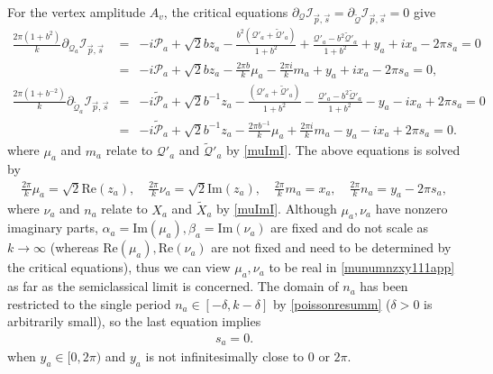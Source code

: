 \documentclass[aps,prd,notitlepage,nofootinbib,superscriptaddress,groupedaddress,twocolumn]{revtex4-1}
\def\be{\begin{eqnarray}}
\def\ee{\end{eqnarray}}
\newcommand{\ci}{\mathcal I}
\newcommand{\scrp}{\mathscr{P}}
\newcommand{\scrq}{\mathscr{Q}}
\renewcommand{\a}{\alpha}
\renewcommand{\b}{\beta}
\newcommand{\lt}{\left}
\newcommand{\rt}{\right}
\begin{document}
For the vertex amplitude $A_v$, the critical equations $\partial_\scrq\ci_{\vec{p},\vec{s}}=\partial_{\widetilde{\scrq}}\ci_{\vec{p},\vec{s}}=0$ give
\be
\frac{2 \pi\left(1+b^{2}\right)}{k}\partial_{\mathscr{Q}_a} \ci_{\vec{p},\vec{s}}&=&-i{\scrp}_a+\sqrt{2}bz_a-\frac{b^2\lt(\scrq'_a+\widetilde{\scrq}'_a\rt)}{1+b^2}+\frac{\scrq'_a-b^2\widetilde{\scrq}'_a}{1+b^2}+y_a+ix_a-2\pi s_a=0\\
&=&-i{\scrp}_a+\sqrt{2}bz_a-\frac{2\pi b}{k}\mu_a-\frac{2\pi i}{k}m_a+y_a+ix_a-2\pi s_a=0, \\
\frac{2 \pi\left(1+b^{-2}\right)}{k}\partial_{\widetilde{\mathscr{Q}}_a} \ci_{\vec{p},\vec{s}}
&=&-i\widetilde{\scrp}_a+\sqrt{2}b^{-1}z_a-\frac{\lt(\scrq'_a+\widetilde{\scrq}'_a\rt)}{1+b^2}-\frac{\scrq'_a-b^2\widetilde{\scrq}'_a}{1+b^2}-y_a-ix_a+2\pi s_a=0\\
&=&-i\widetilde{\scrp}_a+\sqrt{2}b^{-1}z_a-\frac{2\pi b^{-1}}{k}\mu_a+\frac{2\pi i}{k}m_a-y_a-ix_a+2\pi s_a=0.
\ee
where $\mu_a$ and $m_a$ relate to $\scrq'_a$ and $\widetilde{\scrq}'_a$ by \eqref{muImI}. The above equations is solved by 
\be
\frac{2\pi}{k}\mu_a=\sqrt{2}\mathrm{Re}(z_a),\quad \frac{2\pi}{k}\nu_a=\sqrt{2}\mathrm{Im}(z_a),\quad \frac{2\pi}{k}m_a=x_a,\quad \frac{2\pi}{k}n_a=y_a-2\pi s_a,\label{munumnzxy111app}
\ee
where $\nu_a$ and $n_a$ relate to $X_a$ and $\widetilde{X}_a$ by \eqref{muImI}. Although $\mu_a,\nu_a$ have nonzero imaginary parts, $\a_a=\mathrm{Im}(\mu_a),\b_a=\mathrm{Im}(\nu_a)$ are fixed and do not scale as $k\to\infty$ (whereas $\mathrm{Re}(\mu_a),\mathrm{Re}(\nu_a)$ are not fixed and need to be determined by the critical equations), thus we can view $\mu_a,\nu_a$ to be real in \eqref{munumnzxy111app} as far as the semiclassical limit is concerned. The domain of $n_a$ has been restricted to the single period $n_a\in[-\delta,k-\delta]$ by \eqref{poissonresumm} ($\delta>0$ is arbitrarily small), so the last equation implies
\be
s_a=0.
\ee
when $y_a\in[0,2\pi)$ and $y_a$ is not infinitesimally close to $0$ or $2\pi$.











	
\end{document}
